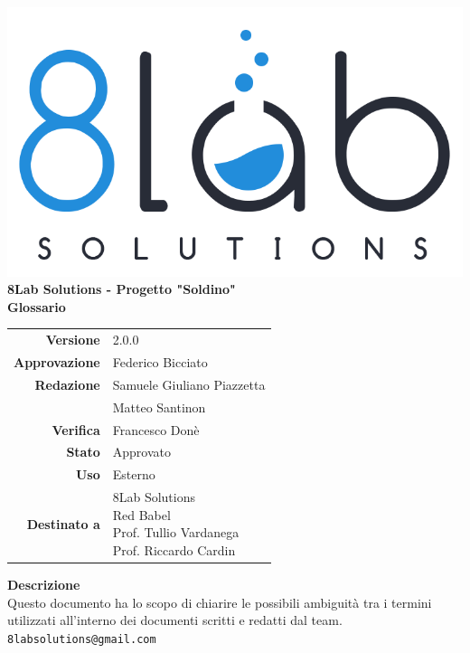 \thispagestyle{empty}
\begin{titlepage}
	\begin{center}
		\includegraphics[scale = 0.3]{res/images/logo8_crop.png}\\
		\large \textbf{8Lab Solutions - Progetto "Soldino"} \\
		\vfill
		\Huge \textbf{Glossario}
		\vspace*{\fill} 
        \vfill
        \large
        \begin{tabular}{r|l}
                        \textbf{Versione} & 2.0.0\\
                        \textbf{Approvazione} &Federico Bicciato\\
                        \textbf{Redazione} & Samuele Giuliano Piazzetta\\
                        & Matteo Santinon \\
                        \textbf{Verifica} &Francesco Donè\\
                        \textbf{Stato} & Approvato\\
                        \textbf{Uso} & Esterno\\
                        \textbf{Destinato a} & \parbox[t]{5cm}{8Lab Solutions\\ Red Babel\\Prof. Tullio Vardanega\\Prof. Riccardo Cardin}
                \end{tabular}
                \vfill
                \normalsize
                \textbf{Descrizione}\\
                Questo documento ha lo scopo di chiarire le possibili ambiguità tra i termini utilizzati all'interno dei documenti scritti e redatti dal team.\\
                \vfill
                \small
                \texttt{8labsolutions@gmail.com}
	\end{center}
\end{titlepage}